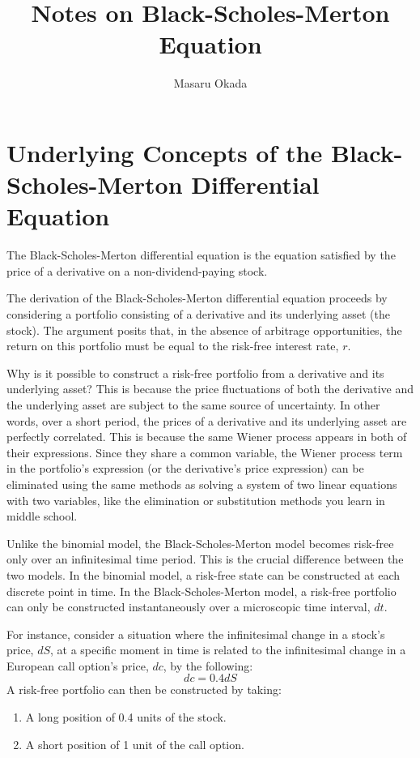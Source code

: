 \documentclass[uplatex]{jsarticle}
\title{Notes on Black-Scholes-Merton Equation}
\author{
Masaru Okada
}
\begin{document}
\maketitle

\maketitle

\section{Underlying Concepts of the Black-Scholes-Merton Differential Equation}

The Black-Scholes-Merton differential equation is the equation satisfied by the price of a derivative on a non-dividend-paying stock.

The derivation of the Black-Scholes-Merton differential equation proceeds by considering a portfolio consisting of a derivative and its underlying asset (the stock). The argument posits that, in the absence of arbitrage opportunities, the return on this portfolio must be equal to the risk-free interest rate, $r$.

Why is it possible to construct a risk-free portfolio from a derivative and its underlying asset? This is because the price fluctuations of both the derivative and the underlying asset are subject to the same source of uncertainty. In other words, over a short period, the prices of a derivative and its underlying asset are perfectly correlated. This is because the same Wiener process appears in both of their expressions. Since they share a common variable, the Wiener process term in the portfolio's expression (or the derivative's price expression) can be eliminated using the same methods as solving a system of two linear equations with two variables, like the elimination or substitution methods you learn in middle school.

Unlike the binomial model, the Black-Scholes-Merton model becomes risk-free only over an infinitesimal time period. This is the crucial difference between the two models. In the binomial model, a risk-free state can be constructed at each discrete point in time. In the Black-Scholes-Merton model, a risk-free portfolio can only be constructed instantaneously over a microscopic time interval, $dt$.

\bigskip

For instance, consider a situation where the infinitesimal change in a stock's price, $dS$, at a specific moment in time is related to the infinitesimal change in a European call option's price, $dc$, by the following:
$$
	dc = 0.4 dS
$$
A risk-free portfolio can then be constructed by taking:
\begin{enumerate}
	\item A long position of 0.4 units of the stock.
	\item A short position of 1 unit of the call option.
\end{enumerate}
\end{document}
